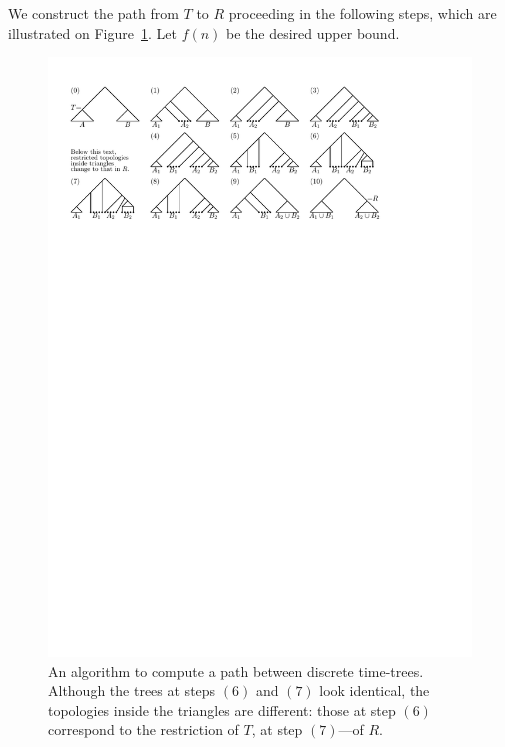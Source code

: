 \documentclass{amsart}
\theoremstyle{definition}
\begin{document}
We construct the path from $T$ to $R$ proceeding in the following steps, which are illustrated on Figure~\ref{diameterUpperBound.pdf}.
Let $f(n)$ be the desired upper bound.

\begin{figure}
\centering
\includegraphics[width = \textwidth]{diameterUpperBound.pdf}
\caption{An algorithm to compute a path between discrete time-trees.
Although the trees at steps $(6)$ and $(7)$ look identical, the topologies inside the triangles are different: those at step $(6)$ correspond to the restriction of $T$, at step $(7)$---of $R$.}
\label{diameterUpperBound.pdf}
\end{figure}
\end{document}
